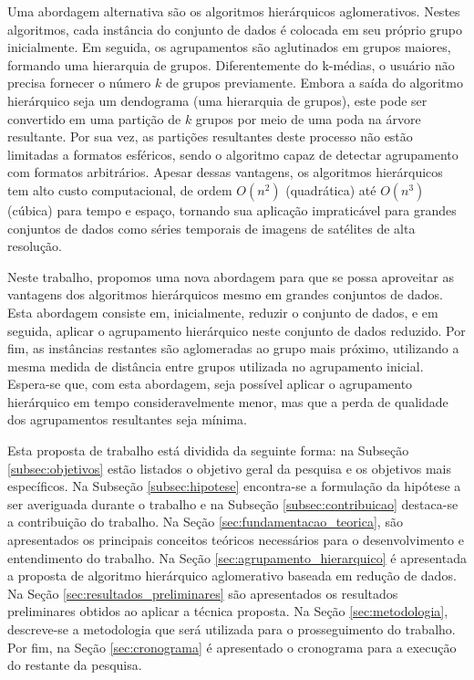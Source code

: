 Uma abordagem alternativa são os algoritmos hierárquicos aglomerativos. Nestes
algoritmos, cada instância do conjunto de dados é colocada em seu próprio grupo
inicialmente. Em seguida, os agrupamentos são aglutinados em grupos maiores, 
formando uma hierarquia de grupos. Diferentemente do k-médias, o usuário
não precisa fornecer o número $k$ de grupos previamente. Embora a saída do 
algoritmo hierárquico seja um dendograma (uma hierarquia de grupos), este pode
ser convertido em uma partição de $k$ grupos por meio de uma poda na árvore
resultante. Por sua vez, as partições resultantes deste processo não estão
limitadas a formatos esféricos, sendo o algoritmo capaz de detectar agrupamento
com formatos arbitrários. Apesar dessas vantagens, os algoritmos hierárquicos
tem alto custo computacional, de ordem $O(n^2)$ (quadrática) até $O(n^3)$
(cúbica) para tempo e espaço, tornando sua aplicação impraticável para grandes
conjuntos de dados como séries temporais de imagens de satélites de alta
resolução.

Neste trabalho, propomos uma nova abordagem para que se possa aproveitar
as vantagens dos algoritmos hierárquicos mesmo em grandes conjuntos de dados.
Esta abordagem consiste em, inicialmente, reduzir o conjunto de dados, e em
seguida, aplicar o agrupamento hierárquico neste conjunto de dados reduzido. Por
fim, as instâncias restantes são aglomeradas ao grupo mais próximo, utilizando a
mesma medida de distância entre grupos utilizada no agrupamento inicial.
Espera-se que, com esta abordagem, seja possível aplicar o agrupamento
hierárquico em tempo consideravelmente menor, mas que a perda de qualidade dos
agrupamentos resultantes seja mínima.

Esta proposta de trabalho está dividida da seguinte forma: na Subseção
\ref{subsec:objetivos} estão listados o objetivo geral da pesquisa e os
objetivos mais específicos. Na Subseção \ref{subsec:hipotese} encontra-se a 
formulação da hipótese a ser averiguada durante o trabalho e na Subseção
\ref{subsec:contribuicao} destaca-se a contribuição do trabalho. Na Seção
\ref{sec:fundamentacao_teorica}, são apresentados os principais conceitos
teóricos necessários para o desenvolvimento e entendimento do trabalho. Na Seção
\ref{sec:agrupamento_hierarquico} é apresentada a proposta de algoritmo
hierárquico aglomerativo baseada em redução de dados. Na Seção
\ref{sec:resultados_preliminares} são apresentados os resultados preliminares
obtidos ao aplicar a técnica proposta. Na Seção \ref{sec:metodologia},
descreve-se a metodologia que será utilizada para o prosseguimento do trabalho.
Por fim, na Seção \ref{sec:cronograma} é apresentado o cronograma para a
execução do restante da pesquisa.

